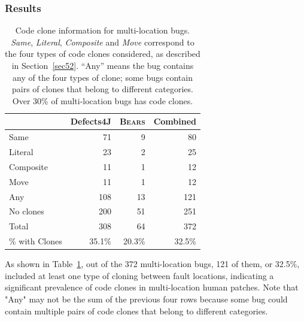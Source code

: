 \documentclass[10pt, conference]{IEEEtran}
\newcommand\bears{\textsc{Bears}\xspace}
\begin{document}
\subsubsection{Results}

\begin{table}
{\begin{center}
\begin{tabular} {lrrr}
\toprule
& Defects4J & \bears & Combined \\
\midrule
Same & 71 & 9 & 80  \\ 
Literal & 23 & 2 & 25  \\
Composite & 11 & 1 & 12  \\
Move & 11 & 1 & 12  \\
\midrule
Any & 108 & 13 & 121  \\
No clones & 200  &  51 & 251 \\
Total & 308 & 64 & 372 \\
\% with Clones & 35.1\% & 20.3\% & 32.5\% \\
\bottomrule
\end{tabular}
\end{center}
}
\caption{Code clone information for multi-location bugs. 
     \emph{Same}, \emph{Literal}, \emph{Composite} and \emph{Move} correspond to the
    four types of code clones considered, as described in Section~\ref{sec52}. ``Any'' means the bug
    contains any of the four types of clone; some bugs contain
    pairs of clones that belong to different categories. 
    Over
    30\% of multi-location bugs has code clones.}
\label{tab:clones}
\end{table}

As shown in Table~\ref{tab:clones}, out of the 372 multi-location bugs,
121 of them, or  32.5\%, included at least one type of cloning between fault locations, indicating a 
significant 
prevalence of code clones in multi-location human patches.
Note that "Any" may not
be the sum of the previous four rows because some bug could contain multiple pairs of code clones 
that
belong to different categories.
\end{document}
